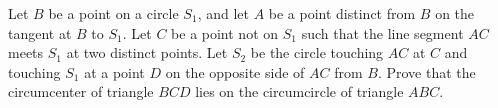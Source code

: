 Let $B$ be a point on a circle $S_1$, and let $A$ be a point distinct from $B$ on the tangent at $B$ to $S_1$. Let $C$ be a point not on $S_1$ such that the line segment $AC$ meets $S_1$ at two distinct points. Let $S_2$ be the circle touching $AC$ at $C$ and touching $S_1$ at a point $D$ on the opposite side of $AC$ from $B$. Prove that the circumcenter of triangle $BCD$ lies on the circumcircle of triangle $ABC$.
